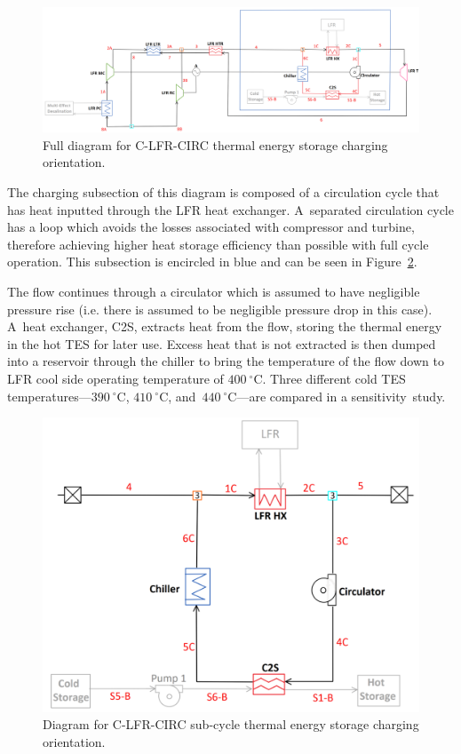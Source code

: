 \documentclass[sustainability,article,accept,moreauthors,pdftex]{Definitions/mdpi}
\begin{document}
\begin{figure}[H]
    \widefigure
    \includegraphics[width=\linewidth]{Definitions/c-lfr-circ.pdf}
    \caption{Full diagram for C-LFR-CIRC thermal energy storage charging orientation\label{c-lfr-circ}.}
\end{figure}
\begin{paracol}{2}
\switchcolumn

The charging subsection of this diagram is composed of a circulation cycle that has heat inputted through the LFR heat exchanger. A~separated circulation cycle has a loop which avoids the losses associated with compressor and turbine, therefore achieving higher heat storage efficiency than possible with full cycle operation. This subsection is encircled in blue and can be seen in Figure~\ref{c-lfr-circ-sub}.

The flow continues through a circulator which is assumed to have negligible pressure rise (i.e. there is assumed to be negligible pressure drop in this case). A~heat exchanger, C2S, extracts heat from the flow, storing the thermal energy in the hot TES for later use. Excess heat that is not extracted is then dumped into a reservoir through the chiller to bring the temperature of the flow down to LFR cool side operating temperature of $400~^{\circ}$C. Three different cold TES temperatures---$390~^{\circ}$C, $410~^{\circ}$C, and~$440~^{\circ}$C---are compared in a sensitivity~study. 

\begin{figure}[H]
    \includegraphics[width=0.7\linewidth]{Definitions/c-lfr-circ-sub.pdf}
    \caption{Diagram for C-LFR-CIRC sub-cycle thermal energy storage charging orientation\label{c-lfr-circ-sub}.}
\end{figure}





\end{paracol}
\end{document}
